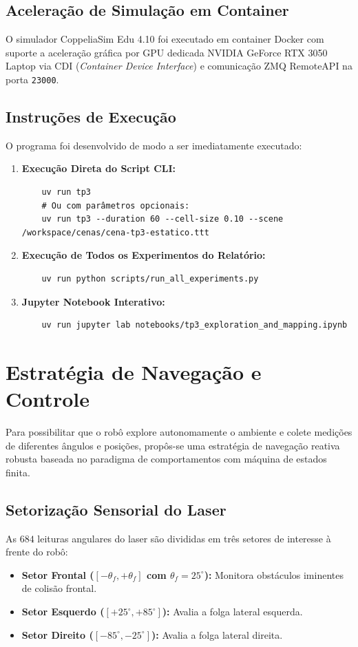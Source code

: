 \documentclass[11pt,a4paper]{article}
\begin{document}
\subsection{Aceleração de Simulação em Container}
O simulador CoppeliaSim Edu 4.10 foi executado em container Docker com suporte a aceleração gráfica por GPU dedicada NVIDIA GeForce RTX 3050 Laptop via CDI (\textit{Container Device Interface}) e comunicação ZMQ RemoteAPI na porta \texttt{23000}.

\subsection{Instruções de Execução}
O programa foi desenvolvido de modo a ser imediatamente executado:
\begin{enumerate}
    \item \textbf{Execução Direta do Script CLI:}
    \begin{verbatim}
    uv run tp3
    # Ou com parâmetros opcionais:
    uv run tp3 --duration 60 --cell-size 0.10 --scene /workspace/cenas/cena-tp3-estatico.ttt
    \end{verbatim}
    \item \textbf{Execução de Todos os Experimentos do Relatório:}
    \begin{verbatim}
    uv run python scripts/run_all_experiments.py
    \end{verbatim}
    \item \textbf{Jupyter Notebook Interativo:}
    \begin{verbatim}
    uv run jupyter lab notebooks/tp3_exploration_and_mapping.ipynb
    \end{verbatim}
\end{enumerate}

\section{Estratégia de Navegação e Controle}

Para possibilitar que o robô explore autonomamente o ambiente e colete medições de diferentes ângulos e posições, propôs-se uma estratégia de navegação reativa robusta baseada no paradigma de comportamentos com máquina de estados finita.

\subsection{Setorização Sensorial do Laser}
As $684$ leituras angulares do laser são divididas em três setores de interesse à frente do robô:
\begin{itemize}
    \item \textbf{Setor Frontal ($[-\theta_f, +\theta_f]$ com $\theta_f = 25^\circ$):} Monitora obstáculos iminentes de colisão frontal.
    \item \textbf{Setor Esquerdo ($[+25^\circ, +85^\circ]$):} Avalia a folga lateral esquerda.
    \item \textbf{Setor Direito ($[-85^\circ, -25^\circ]$):} Avalia a folga lateral direita.
\end{itemize}
\end{document}
